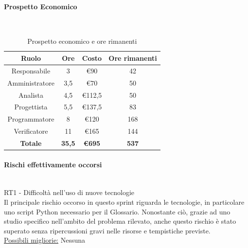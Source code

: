 \documentclass{article}
\begin{document}
                \paragraph{Prospetto Economico}\mbox{}\\
                \begin{table}[H]
                    \centering
                    \begin{tabular}{|c|c|c|c|}
                    \hline
                    \textbf{Ruolo}  & \textbf{Ore}  & \textbf{Costo} & \textbf{Ore rimanenti} \\ \hline
                    Responsabile    & 3             & €90            & 42                     \\ \hline
                    Amministratore  & 3,5           & €70            & 50                   \\ \hline
                    Analista        & 4,5           & €112,5          & 50                   \\ \hline
                    Progettista     & 5,5           & €137,5         & 83                   \\ \hline
                    Programmatore   & 8            & €120           & 168                    \\ \hline
                    Verificatore    & 11            & €165           & 144                    \\ \hline
                    \textbf{Totale} & \textbf{35,5} & \textbf{\euro695}   & \textbf{537}         \\ \hline
                    \end{tabular}
                    \caption{Prospetto economico e ore rimanenti}
                \end{table}


                \paragraph{Rischi effettivamente occorsi}\mbox{}\\
                RT1 - Difficoltà nell’uso di nuove tecnologie \\
                Il principale rischio occorso in questo sprint riguarda le tecnologie, in particolare uno script Python necessario per il Glossario. Nonostante ciò, grazie ad uno studio specifico nell’ambito del problema rilevato, anche questo rischio è stato superato senza ripercussioni gravi nelle risorse e tempistiche previste. \\
                \underline{Possibili migliorie:} Nessuna
\end{document}
